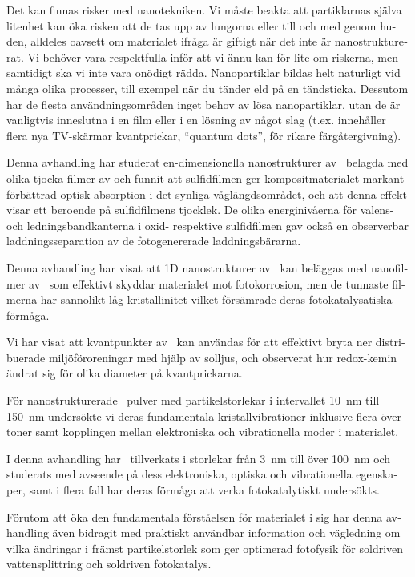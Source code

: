 \documentclass[draft,webedition,openright,titles,swedish,english]{LuaUUThesis}\usepackage[]{graphicx}\usepackage[]{xcolor}
\begin{document}
\begin{otherlanguage}{swedish}
Det kan finnas risker med nanotekniken.
Vi måste beakta att partiklarnas själva litenhet kan öka risken att de tas
upp av lungorna eller till och med genom huden, alldeles oavsett om materialet
ifråga är giftigt när det inte är nanostrukturerat.
Vi behöver vara respektfulla inför att vi ännu kan för lite om riskerna,
men samtidigt ska vi inte vara onödigt rädda.
Nanopartiklar bildas helt naturligt vid många olika processer, till exempel
när du tänder eld på en tändsticka.
Dessutom har de flesta användningsområden inget behov av lösa nanopartiklar,
utan de är vanligtvis inneslutna i en film eller i en lösning
av något slag (t.ex. innehåller flera nya TV-skärmar kvantprickar, \enquote{quantum dots},
för rikare färgåtergivning).



Denna avhandling har studerat en-dimensionella nanostrukturer av \ZnO\ belagda
med olika tjocka filmer av  och funnit att sulfidfilmen ger kompositmaterialet
markant förbättrad optisk absorption i det synliga våglängdsområdet, och att
denna effekt visar ett beroende på sulfidfilmens tjocklek.
De olika energinivåerna för valens- och ledningsbandkanterna i oxid- respektive
sulfidfilmen gav också en observerbar laddningsseparation av de fotogenererade
laddningsbärarna.

Denna avhandling har visat att 1D nanostrukturer av \ZnO\ kan beläggas med
nanofilmer av \ironox\ som effektivt skyddar materialet mot fotokorrosion,
men de tunnaste filmerna har sannolikt låg kristallinitet vilket
försämrade deras fotokatalysatiska förmåga.

Vi har visat att kvantpunkter av \ZnO\ kan användas för att effektivt
bryta ner distribuerade miljöföroreningar med hjälp av solljus,
och observerat hur redox-kemin ändrat sig för olika diameter på kvantprickarna.

För nanostrukturerade \ZnO\ pulver med partikelstorlekar i intervallet
\qty{10}{\nm} till \qty{150}{\nm} undersökte vi
deras fundamentala kristallvibrationer inklusive flera övertoner samt kopplingen
mellan elektroniska och vibrationella moder i materialet.

I denna avhandling har \ZnO\ tillverkats i storlekar från \qty{3}{\nm} till över
\qty{100}{\nm} och studerats med avseende på dess elektroniska, optiska och
vibrationella egenskaper, samt i flera fall har deras förmåga att verka fotokatalytiskt
undersökts.

Förutom att öka den fundamentala förståelsen för materialet i sig har denna
avhandling även bidragit med praktiskt användbar information och vägledning
om vilka ändringar i främst partikelstorlek som ger optimerad fotofysik för
soldriven vattensplittring och soldriven fotokatalys.
\end{otherlanguage}
\end{document}
